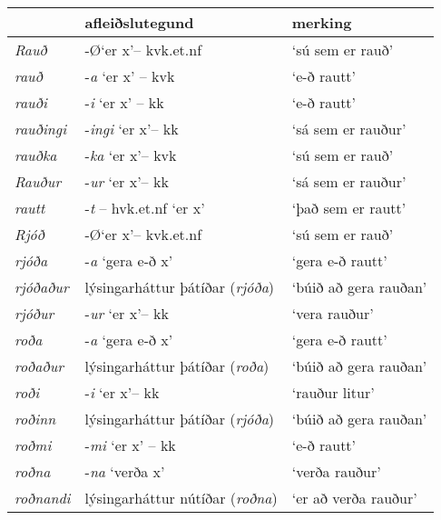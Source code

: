 \documentclass[../samsetningasafn.tex]{subfiles}
\begin{document}
\begin{table}[ht!]%
\begin{footnotesize}
\begin{tcolorbox}
	\begin{center}
	\begin{tabularx}{\textwidth}{Xll}
						&	\textbf{afleiðslutegund}					&	\textbf{merking}	\\
	\hline
	\textit{Rauð}		&	-\O \lq er x\rq -- kvk.et.nf					&	\lq sú sem er rauð\rq	\\
	\textit{rauð}			&	-\textit{a} \lq er x\rq{} -- kvk				&	\lq e-ð rautt\rq	\\
	\textit{rauði}		&	-\textit{i} \lq er x\rq{} -- kk 				&	\lq e-ð rautt\rq	\\
	\textit{rauðingi}		&	-\textit{ingi} \lq er x\rq -- kk				&	\lq sá sem er rauður\rq	\\
	\textit{rauðka}		&	-\textit{ka} \lq er x\rq -- kvk 				&	\lq sú sem er rauð\rq	\\
	\textit{Rauður}		&	-\textit{ur} \lq er x\rq -- kk				&	\lq sá sem er rauður\rq	\\
	\textit{rautt}		&	-\textit{t} -- hvk.et.nf \lq er x\rq			&	\lq það sem er rautt\rq	\\
	\textit{Rjóð}		&	-\O \lq er x\rq -- kvk.et.nf					&	\lq sú sem er rauð\rq		\\
	\textit{rjóða}		&	-\textit{a} \lq gera e-ð x\rq				&	\lq gera e-ð rautt\rq		\\
	\textit{rjóðaður}		& 	lýsingarháttur þátíðar (\textit{rjóða})			& 	\lq búið að gera rauðan\rq		\\
	\textit{rjóður}		&	-\textit{ur} \lq er x\rq -- kk				&	\lq vera rauður\rq	\\
	\textit{roða}			&	-\textit{a} \lq gera e-ð x\rq				&	\lq gera e-ð rautt\rq		\\
	\textit{roðaður}		&	lýsingarháttur þátíðar (\textit{roða})		&	\lq búið að gera rauðan\rq	\\
	\textit{roði}			&	-\textit{i} \lq er x\rq -- kk					&	\lq rauður litur\rq	\\
	\textit{roðinn}		&	lýsingarháttur þátíðar (\textit{rjóða})		&	\lq búið að gera rauðan\rq	\\
	\textit{roðmi}		&	-\textit{mi} \lq er x\rq{} -- kk 			&	\lq e-ð rautt\rq	\\
	\textit{roðna}		&	-\textit{na} \lq verða x\rq				&	\lq verða rauður\rq	\\
	\textit{roðnandi}		&	lýsingarháttur nútíðar (\textit{roðna})		&	\lq er að verða rauður\rq	\\

\end{tabularx}
\end{center}
\end{tcolorbox}
\end{footnotesize}
\end{table}
\end{document}
